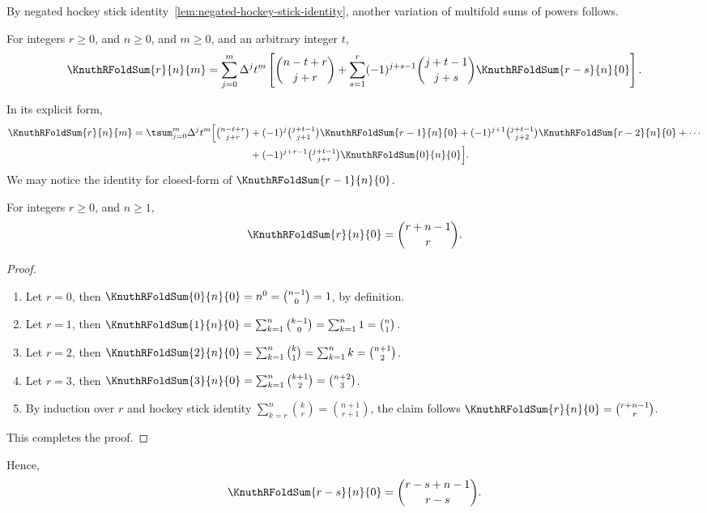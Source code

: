By negated hockey stick
identity~\eqref{lem:negated-hockey-stick-identity}, another
variation of multifold sums of powers follows.
\begin{theorem}
  \label{theorem:negated-multifold-sums-of-powers-via-newtons-formula}
  For integers $r\geq 0$, and $n\geq 0$, and $m\geq 0$,
  and an arbitrary integer $t$,
  \begin{align*}
    \KnuthRFoldSum{r}{n}{m}
    = \sum_{j=0}^{m} \Delta^{j} t^{m}
    \left[
      \binom{n-t+r}{j+r}
      + \sum_{s=1}^{r} (-1)^{j+s-1} \binom{j+t-1}{j+s} \KnuthRFoldSum{r-s}{n}{0}
    \right].
  \end{align*}
\end{theorem}
In its explicit form,
\begin{align*}
  \KnuthRFoldSum{r}{n}{m} = \tsum_{j=0}^{m} \Delta^{j} t^{m}
  \Big[
    \tbinom{n-t+r}{j+r}
    &+ (-1)^{j}   \tbinom{j+t-1}{j+1} \KnuthRFoldSum{r-1}{n}{0}
    + (-1)^{j+1} \tbinom{j+t-1}{j+2} \KnuthRFoldSum{r-2}{n}{0} + \cdots \\
    &+ (-1)^{j+r-1} \tbinom{j+t-1}{j+r} \KnuthRFoldSum{0}{n}{0}
  \Big].
\end{align*}
We may notice the identity for closed-form of
$\KnuthRFoldSum{r-1}{n}{0}$.

\begin{proposition}
  \label{prop:multifold-sum-of-zero-powers}
  For integers $r \geq 0$, and $n\geq 1$,
  \begin{align*}
    \KnuthRFoldSum{r}{n}{0} = \binom{r+n-1}{r}.
  \end{align*}
  \begin{proof}
    \begin{enumerate}
      \item Let $r=0$, then $\KnuthRFoldSum{0}{n}{0}=n^0=\binom{n-1}{0} = 1$,
        by definition.
      \item Let $r=1$, then
        $\KnuthRFoldSum{1}{n}{0}
        = \sum_{k=1}^{n} \binom{k-1}{0}
        = \sum_{k=1}^{n} 1 = \binom{n}{1}$.
      \item Let $r=2$, then
        $\KnuthRFoldSum{2}{n}{0}= \sum_{k=1}^{n} \binom{k}{1}
        = \sum_{k=1}^{n} k = \binom{n+1}{2}$.
      \item Let $r=3$, then
        $\KnuthRFoldSum{3}{n}{0}
        = \sum_{k=1}^{n} \binom{k+1}{2}
        = \binom{n+2}{3}$.
      \item By induction over $r$ and hockey stick identity
        $\sum_{k=r}^{n} \binom{k}{r} = \binom{n+1}{r+1}$,
        the claim follows
        $\KnuthRFoldSum{r}{n}{0} = \binom{r+n-1}{r}$.
    \end{enumerate}
    This completes the proof.
  \end{proof}
\end{proposition}
Hence,
\begin{align*}
  \KnuthRFoldSum{r-s}{n}{0} = \binom{r-s+n-1}{r-s}.
\end{align*}

